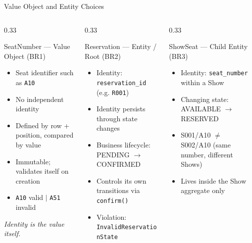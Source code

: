 \documentclass[aspectratio=169,11pt]{beamer}
\newcommand{\code}[1]{\texttt{#1}}
\begin{document}
\begin{frame}{Value Object and Entity Choices}
  \begin{columns}[t]
    \begin{column}{0.33\textwidth}
      \begin{block}{SeatNumber --- Value Object (BR1)}
        \footnotesize
        \begin{itemize}
          \item Seat identifier such as \code{A10}
          \item No independent identity
          \item Defined by row + position, compared by value
          \item Immutable; validates itself on creation
          \item \code{A10} valid $|$ \code{A51} invalid
        \end{itemize}
        {\scriptsize\itshape Identity is the value itself.}
      \end{block}
    \end{column}
    \begin{column}{0.33\textwidth}
      \begin{block}{Reservation --- Entity / Root (BR2)}
        \footnotesize
        \begin{itemize}
          \item Identity: \code{reservation\_id} (e.g. \code{R001})
          \item Identity persists through state changes
          \item Business lifecycle: PENDING $\rightarrow$ CONFIRMED
          \item Controls its own transitions via \code{confirm()}
          \item Violation: \code{InvalidReservationState}
        \end{itemize}
      \end{block}
    \end{column}
    \begin{column}{0.33\textwidth}
      \begin{block}{ShowSeat --- Child Entity (BR3)}
        \footnotesize
        \begin{itemize}
          \item Identity: \code{seat\_number} within a Show
          \item Changing state: AVAILABLE $\rightarrow$ RESERVED
          \item S001/A10 $\neq$ S002/A10 (same number, different Shows)
          \item Lives inside the Show aggregate only
        \end{itemize}
      \end{block}
    \end{column}
  \end{columns}


\end{frame}
\end{document}
